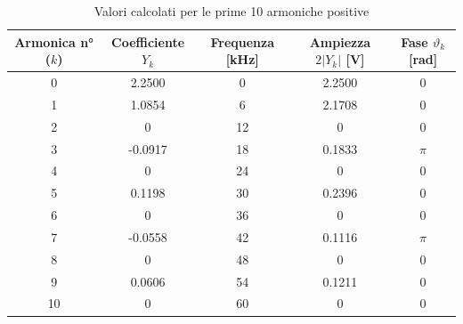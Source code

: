 \begin{table}[h]
    \centering
    \begin{tabular}{|c|c|c|c|c|}
        \hline
        \textbf{Armonica n° ($k$)} & \textbf{Coefficiente $Y_k$} & \textbf{Frequenza [kHz]} & \textbf{Ampiezza $2|Y_k|$ [V]} & \textbf{Fase $\vartheta_k$ [rad]} \\
        \hline
        0                          & 2.2500                      & 0                        & 2.2500                         & 0                                 \\
        1                          & 1.0854                      & 6                        & 2.1708                         & 0                                 \\
        2                          & 0                           & 12                       & 0                              & 0                                 \\
        3                          & -0.0917                     & 18                       & 0.1833                         & $\pi$                             \\
        4                          & 0                           & 24                       & 0                              & 0                                 \\
        5                          & 0.1198                      & 30                       & 0.2396                         & 0                                 \\
        6                          & 0                           & 36                       & 0                              & 0                                 \\
        7                          & -0.0558                     & 42                       & 0.1116                         & $\pi$                             \\
        8                          & 0                           & 48                       & 0                              & 0                                 \\
        9                          & 0.0606                      & 54                       & 0.1211                         & 0                                 \\
        10                         & 0                           & 60                       & 0                              & 0                                 \\
        \hline
    \end{tabular}
    \caption{Valori calcolati per le prime 10 armoniche positive}
\end{table}

